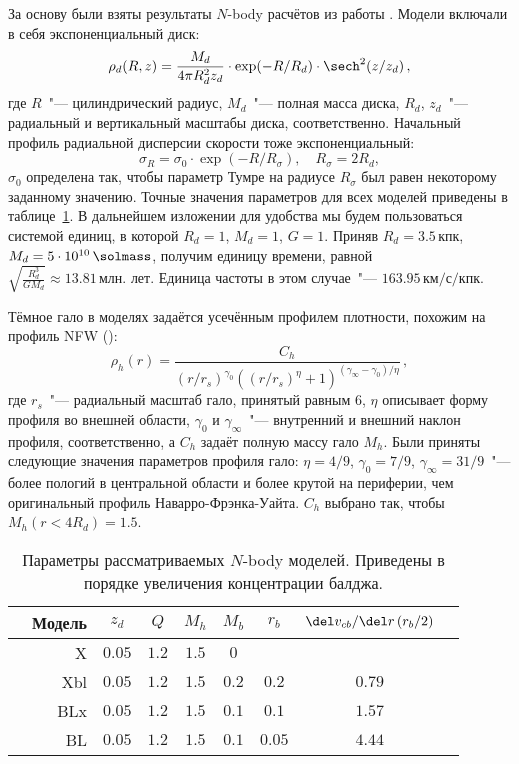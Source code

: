 \documentclass{trlnotes}
\begin{document}
За основу были взяты результаты $N$-body расчётов из работы 
\citet{smirnov2018}. %
Модели включали в себя экспоненциальный диск:
\begin{equation}
  \label{eq:rho_disk} \rho_d(R,z) = \frac{M_d}{4\pi R_d^2 z_d} \cdot \exp(-R/R_d) \cdot \sech^2(z/z_d)\,,
\end{equation}
где $R$~"--- цилиндрический радиус, $M_d$~"--- полная масса диска, $R_d$, $z_d$~"--- радиальный и вертикальный 
масштабы диска, соответственно. Начальный профиль радиальной дисперсии скорости тоже экспоненциальный:
\begin{equation}
  \label{eq:sigma_disk} σ_R = σ_0 \cdot \exp (-R/R_σ), \quad R_σ = 2 R_d, 
\end{equation}
$σ_0$ определена так, чтобы параметр Тумре \citep{toomre1964} на 
радиусе $R_σ$ был равен некоторому заданному значению.  Точные 
значения параметров для всех моделей приведены в 
таблице~\ref{tab:modelpars}.
В дальнейшем изложении для удобства мы будем пользоваться системой 
единиц, в которой $R_d = 1$, $M_d = 1$, $G = 1$. Приняв $R_d = 
3.5\,\text{кпк}$, $M_d = 5\cdot 10^{10}\,\solmass$, получим единицу 
времени, равной $\sqrt{\frac{R_d^3}{GM_d}}\approx 13.81\, \text{млн. лет}$. Единица частоты в этом случае~"--- 
$163.95\,\text{км}/\text{с}/\text{кпк}$.  

Тёмное гало в моделях задаётся усечённым профилем плотности, похожим на профиль NFW (\cite{navarro1996}):
\begin{equation}
  \rho_h(r) = \frac{C_h}{(r/r_s)^{\gamma_0}\left((r/r_s)^\eta+1\right)^{(\gamma_\infty-\gamma_0)/\eta}} \,, \label{eq:NFW}
\end{equation}
где $r_s$~"--- радиальный масштаб гало, принятый равным 6, $η$ 
описывает форму профиля во внешней области, $γ_0$ и 
$γ_{\infty}$~"--- внутренний и внешний наклон профиля, 
соответственно, а $C_h$ задаёт полную массу гало $M_h$. Были 
приняты следующие значения параметров профиля гало:
$η = 4/9$, $γ_0 = 7/9$, $γ_∞ = 31/9$~"---  более пологий в центральной области и более крутой на периферии, чем 
оригинальный профиль Наварро-Фрэнка-Уайта. $C_h$ выбрано так, чтобы $M_h(r < 4R_d) = 1.5$. 

\begin{table}[htpb]
  \centering
  \begin{tabular}{cr|ccccccc}
  \toprule
     & Модель & $z_d$ & $Q$ & $M_h$ & $M_b$ & $r_b$ & $\del v_{cb}/\del r \, (r_b/2)$ & \\
  \midrule
     &X   & $0.05$ & $1.2$ & $1.5$ & $0$ &  &  &\\
     &Xbl & $0.05$ & $1.2$ & $1.5$ & $0.2$ & $0.2$ & $0.79$ &\\
     &BLx & $0.05$ & $1.2$ & $1.5$ & $0.1$ & $0.1$ & $1.57$\\
     &BL  & $0.05$ & $1.2$ & $1.5$ & $0.1$ & $0.05$ & $4.44$ &\\
  \bottomrule
  \end{tabular}
  \caption{Параметры рассматриваемых $N$-body моделей. Приведены в порядке увеличения концентрации балджа.}
  \label{tab:modelpars}
\end{table}
\end{document}
